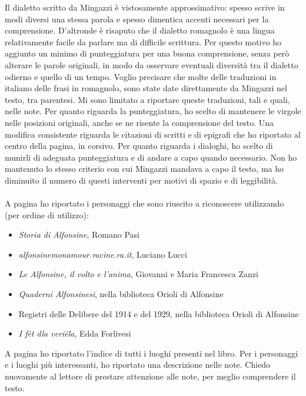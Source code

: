 \newpage
\noindent Il dialetto scritto da Mingazzi è vistosamente approssimativo: spesso scrive in modi diversi una stessa parola e spesso dimentica accenti necessari per la comprensione. D'altronde è risaputo che il dialetto romagnolo è una lingua relativamente facile da parlare ma di difficile scrittura. Per questo motivo ho aggiunto un minimo di punteggiatura per una buona comprensione, senza però alterare le parole originali, in modo da osservare eventuali diversità tra il dialetto odierno e quello di un tempo. Voglio precisare che molte delle traduzioni in italiano delle frasi in romagnolo, sono state date direttamente da Mingazzi nel testo, tra parentesi. Mi sono limitato a riportare queste traduzioni, tali e quali, nelle note. Per quanto riguarda la punteggiatura, ho scelto di mantenere le virgole nelle posizioni originali, anche se ne risente la comprensione del testo. Una modifica consistente riguarda le citazioni di scritti e di epigrafi che ho riportato al centro della pagina, in corsivo. Per quanto riguarda i dialoghi, ho scelto di munirli di adeguata punteggiatura e di andare a capo quando necessario. Non ho mantenuto lo stesso criterio con cui Mingazzi mandava a capo il testo, ma ho diminuito il numero di questi interventi per motivi di spazio e di leggibilità.	\\\\
\label{fonti}
\noindent A pagina \pageref{Personaggi} ho riportato i personaggi che sono riuscito a riconoscere utilizzando (per ordine di utilizzo):
\begin{itemize}\itemsep2pt
\item{\emph{Storia di Alfonsine}, Romano Pasi}
\item{\emph{alfonsinemonamour.racine.ra.it}, Luciano Lucci}
\item{\emph{Le Alfonsine, il volto e l'anima}, Giovanni e Maria Francesca Zanzi}
\item{\emph{Quaderni Alfonsinesi}, nella biblioteca Orioli di Alfonsine}
\item{Registri delle Delibere del 1914 e del 1929, nella biblioteca Orioli di Alfonsine}
\item{\emph{I fèt dla veriëla}, Edda Forlivesi}
\end{itemize}

A pagina \pageref{Luoghi} ho riportato l'indice di tutti i luoghi presenti nel libro. Per i personaggi e i luoghi più interessanti, ho riportato una descrizione nelle note. Chiedo nuovamente al lettore di prestare attenzione alle note, per meglio comprendere il testo.\\

